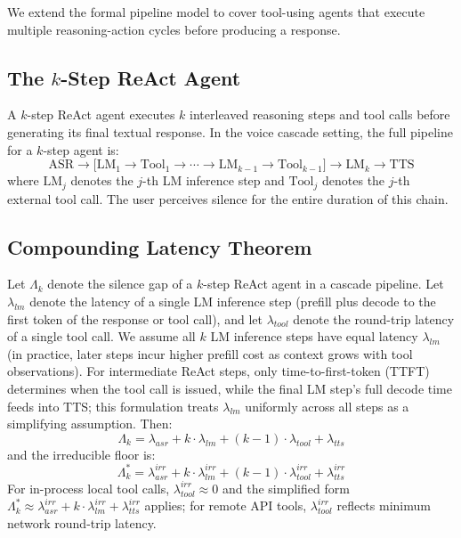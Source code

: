 We extend the formal pipeline model to cover tool-using agents that execute multiple
reasoning-action cycles before producing a response.

\subsection{The \texorpdfstring{$k$}{k}-Step ReAct Agent}

A $k$-step ReAct agent \citep{yao2023react} executes $k$ interleaved reasoning steps
and tool calls before generating its final textual response.
In the voice cascade setting, the full pipeline for a $k$-step agent is:
\begin{equation}
  \text{ASR} \to \bigl[\text{LM}_1 \to \text{Tool}_1 \to \cdots
  \to \text{LM}_{k-1} \to \text{Tool}_{k-1}\bigr]
  \to \text{LM}_k \to \text{TTS}
\end{equation}
where $\text{LM}_j$ denotes the $j$-th LM inference step and $\text{Tool}_j$ denotes
the $j$-th external tool call.
The user perceives silence for the entire duration of this chain.

\subsection{Compounding Latency Theorem}

\begin{theorem}
\label{thm:react}
Let $\Lambda_k$ denote the silence gap of a $k$-step ReAct agent in a cascade pipeline.
Let $\lambda_{lm}$ denote the latency of a single LM inference step
(prefill plus decode to the first token of the response or tool call),
and let $\lambda_{tool}$ denote the round-trip latency of a single tool call.
We assume all $k$ LM inference steps have equal latency $\lambda_{lm}$ (in practice, later steps incur higher prefill cost as context grows with tool observations).
For intermediate ReAct steps, only time-to-first-token (TTFT) determines when the tool call is issued, while the final LM step's full decode time feeds into TTS; this formulation treats $\lambda_{lm}$ uniformly across all steps as a simplifying assumption.
Then:
\begin{equation}
  \Lambda_k = \lambda_{asr} + k \cdot \lambda_{lm} + (k-1) \cdot \lambda_{tool} + \lambda_{tts}
\end{equation}
and the irreducible floor is:
\begin{equation}
  \Lambda_k^* = \lambda_{asr}^{irr} + k \cdot \lambda_{lm}^{irr} + (k-1) \cdot \lambda_{tool}^{irr} + \lambda_{tts}^{irr}
\end{equation}
For in-process local tool calls, $\lambda_{tool}^{irr} \approx 0$ and the simplified form $\Lambda_k^* \approx \lambda_{asr}^{irr} + k \cdot \lambda_{lm}^{irr} + \lambda_{tts}^{irr}$ applies; for remote API tools, $\lambda_{tool}^{irr}$ reflects minimum network round-trip latency.
\end{theorem}


